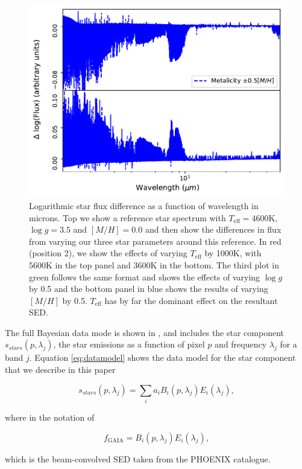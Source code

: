 \documentclass{aa}
\begin{document}
\begin{figure}
\includegraphics[width=0.85\columnwidth]{figs/gaia/m_depends.pdf}
  \caption{Logarithmic star flux difference as a function of wavelength in microns. Top  we show a reference star spectrum with $T_{\mathrm{eff}}= 4600$K, $\log g = 3.5$ and $[M/H]= 0.0$ and then show the differences in flux from varying our three star parameters around this reference. In red (position 2), we show the effects of varying $T_{\mathrm{eff}}$ by 1000K, with 5600K in the top panel and 3600K in the bottom. The third plot in green follows the same format and shows the effects of varying $\log g$ by 0.5 and the bottom panel in blue shows the results of varying $[M/H]$ by 0.5. $T_{\mathrm{eff}}$ has by far the dominant effect on the resultant SED.}
  \label{fig:catalogueSEDs}
\end{figure}


The full Bayesian data mode is shown in \cite{CG02_01}, and includes the star component $s_{stars}(p, \lambda_j)$, the star emissions as a function of pixel $p$ and frequency $\lambda_j$ for a band $j$. Equation \ref{eq:datamodel} shows the data model for the star component that we describe in this paper


\begin{equation}
s_{stars}(p, \lambda_j) = \sum_i a_i B_i(p, \lambda_j) E_i(\lambda_j),
\label{eq:datamodel}
\end{equation}

where in the notation of \cite{CG02_01} 

\begin{equation}
f_{\mathrm{GAIA}} = B_i(p, \lambda_j) E_i(\lambda_j),
\end{equation}

which is the beam-convolved SED taken from the PHOENIX catalogue.
\end{document}
